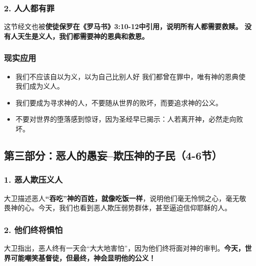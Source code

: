 \documentclass[a4paper, 12pt]{article}
\begin{document}
\subsubsection*{2. 人人都有罪}
  
这节经文也被\textbf{使徒保罗在《罗马书》3:10-12中引用，说明所有人都需要救赎。} \textbf{没有人天生是义人，我们都需要神的恩典和救恩。  }


\subsubsection*{现实应用 }

\begin{itemize}
    \item 我们不应该自以为义，以为自己比别人好 我们都曾在罪中，唯有神的恩典使我们成为义人。  
    \item 我们要成为寻求神的人，不要随从世界的败坏，而要追求神的公义。 
    \item 不要对世界的堕落感到惊讶，因为圣经早已揭示：人若离开神，必然走向败坏。
\end{itemize}

\subsection*{第三部分：恶人的愚妄--欺压神的子民（4-6节）}


\subsubsection*{1. 恶人欺压义人}

大卫描述恶人\textbf{“吞吃”神的百姓，就像吃饭一样}，说明他们毫无怜悯之心，毫无敬畏神的心。今天，我们也看到恶人欺压弱势群体，甚至逼迫信仰耶稣的人。  

\subsubsection*{2. 他们终将惧怕 }
大卫指出，恶人终有一天会“大大地害怕”，因为他们终将面对神的审判。\textbf{今天，世界可能嘲笑基督徒，但最终，神会显明他的公义！  }
\end{document}
